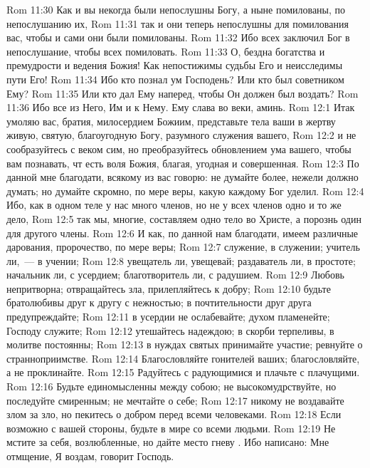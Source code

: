 \vs Rom 11:30 Как и вы некогда были непослушны Богу, а ныне помилованы, по непослушанию их,
\vs Rom 11:31 так и они теперь непослушны для помилования вас, чтобы и сами они были помилованы.
\vs Rom 11:32 Ибо всех заключил Бог в непослушание, чтобы всех помиловать.
\rsbpar\vs Rom 11:33 О, бездна богатства и премудрости и ведения Божия! Как непостижимы судьбы Его и неисследимы пути Его!
\vs Rom 11:34 Ибо кто познал ум Господень? Или кто был советником Ему?
\vs Rom 11:35 Или кто дал Ему наперед, чтобы Он должен был воздать?
\vs Rom 11:36 Ибо все из Него, Им и к Нему. Ему слава во веки, аминь.
\vs Rom 12:1 Итак умоляю вас, братия, милосердием Божиим, представьте тела ваши в жертву живую, святую, благоугодную Богу,  разумного служения вашего,
\vs Rom 12:2 и не сообразуйтесь с веком сим, но преобразуйтесь обновлением ума вашего, чтобы вам познавать, чт есть воля Божия, благая, угодная и совершенная.
\rsbpar\vs Rom 12:3 По данной мне благодати, всякому из вас говорю: не думайте  более, нежели должно думать; но думайте скромно, по мере веры, какую каждому Бог уделил.
\vs Rom 12:4 Ибо, как в одном теле у нас много членов, но не у всех членов одно и то же дело,
\vs Rom 12:5 так мы, многие, составляем одно тело во Христе, а порознь один для другого члены.
\vs Rom 12:6 И как, по данной нам благодати, имеем различные дарования,  пророчество,  по мере веры;
\vs Rom 12:7  служение,  в служении; учитель ли,~--- в учении;
\vs Rom 12:8 увещатель ли, увещевай; раздаватель ли,  в простоте; начальник ли,  с усердием; благотворитель ли,  с радушием.
\vs Rom 12:9 Любовь  непритворна; отвращайтесь зла, прилепляйтесь к добру;
\vs Rom 12:10 будьте братолюбивы друг к другу с нежностью; в почтительности друг друга предупреждайте;
\vs Rom 12:11 в усердии не ослабевайте; духом пламенейте; Господу служите;
\vs Rom 12:12 утешайтесь надеждою; в скорби  терпеливы, в молитве постоянны;
\vs Rom 12:13 в нуждах святых принимайте участие; ревнуйте о странноприимстве.
\vs Rom 12:14 Благословляйте гонителей ваших; благословляйте, а не проклинайте.
\vs Rom 12:15 Радуйтесь с радующимися и плачьте с плачущими.
\vs Rom 12:16 Будьте единомысленны между собою; не высокомудрствуйте, но последуйте смиренным; не мечтайте о себе;
\vs Rom 12:17 никому не воздавайте злом за зло, но пекитесь о добром перед всеми человеками.
\vs Rom 12:18 Если возможно с вашей стороны, будьте в мире со всеми людьми.
\vs Rom 12:19 Не мстите за себя, возлюбленные, но дайте место гневу . Ибо написано: Мне отмщение, Я воздам, говорит Господь.
